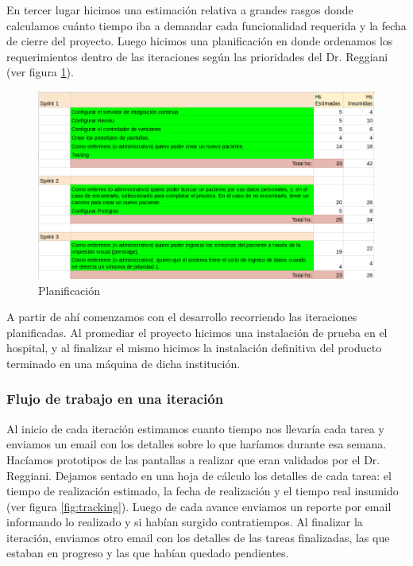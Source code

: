 En tercer lugar hicimos una estimación relativa a grandes rasgos donde calculamos cuánto tiempo iba a demandar cada funcionalidad requerida y la fecha de cierre del proyecto. Luego hicimos una planificación en donde ordenamos los requerimientos dentro de las iteraciones según las prioridades del Dr. Reggiani (ver figura \ref{fig:planificacion}).

\begin{figure}
  \centerline{\includegraphics[width=1.2\textwidth]{planificacion.png}}
  \caption{Planificación}
  \label{fig:planificacion}
\end{figure}

A partir de ahí comenzamos con el desarrollo recorriendo las iteraciones planificadas. Al promediar el proyecto hicimos una instalación de prueba en el hospital, y al finalizar el mismo hicimos la instalación definitiva del producto terminado en una máquina de dicha institución.

\subsubsection{Flujo de trabajo en una iteración}
Al inicio de cada iteración estimamos cuanto tiempo nos llevaría cada tarea y enviamos un email con los detalles sobre lo que haríamos durante esa semana. Hacíamos prototipos de las pantallas a realizar que eran validados por el Dr. Reggiani. Dejamos sentado en una hoja de cálculo los detalles de cada tarea: el tiempo de realización estimado, la fecha de realización y el tiempo real insumido (ver figura \ref{fig:tracking}). Luego de cada avance enviamos un reporte por email informando lo realizado y si habían surgido contratiempos. Al finalizar la iteración, enviamos otro email con los detalles de las tareas finalizadas, las que estaban en progreso y las que habían quedado pendientes.

